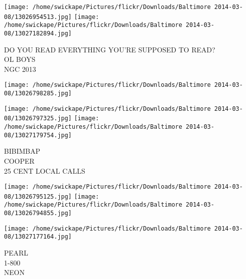\documentclass[10pt,letterpaper]{article}
\begin{document}
\vspace{0.25in}
\texttt{[image: /home/swickape/Pictures/flickr/Downloads/Baltimore 2014-03-08/13026954513.jpg]}
\texttt{[image: /home/swickape/Pictures/flickr/Downloads/Baltimore 2014-03-08/13027182894.jpg]}

DO YOU READ EVERYTHING YOU'RE SUPPOSED TO READ?\\
OL BOYS\\
NGC 2013\\
\pagebreak

\texttt{[image: /home/swickape/Pictures/flickr/Downloads/Baltimore 2014-03-08/13026798285.jpg]}

\vspace{0.25in}
\texttt{[image: /home/swickape/Pictures/flickr/Downloads/Baltimore 2014-03-08/13026797325.jpg]}
\texttt{[image: /home/swickape/Pictures/flickr/Downloads/Baltimore 2014-03-08/13027179754.jpg]}

BIBIMBAP\\
COOPER\\
25 CENT LOCAL CALLS\\
\pagebreak

\texttt{[image: /home/swickape/Pictures/flickr/Downloads/Baltimore 2014-03-08/13026795125.jpg]}
\texttt{[image: /home/swickape/Pictures/flickr/Downloads/Baltimore 2014-03-08/13026794855.jpg]}

\texttt{[image: /home/swickape/Pictures/flickr/Downloads/Baltimore 2014-03-08/13027177164.jpg]}

PEARL\\
1{-}800\\
NEON\\
\pagebreak
\end{document}
